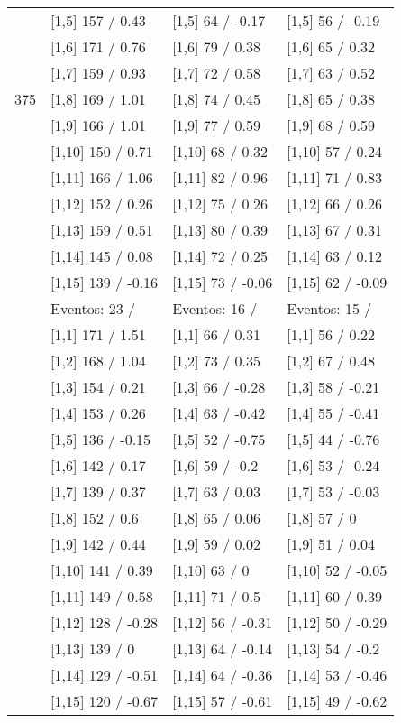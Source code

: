 \begin{table}
\begin{tabular}[t]{llll}
 & {}[1,5] 157  / 0.43 & {}[1,5] 64  / -0.17 & {}[1,5] 56  / -0.19\\
 & {}[1,6] 171  / 0.76 & {}[1,6] 79  / 0.38 & {}[1,6] 65  / 0.32\\
 & {}[1,7] 159  / 0.93 & {}[1,7] 72  / 0.58 & {}[1,7] 63  / 0.52\\
375 & {}[1,8] 169  / 1.01 & {}[1,8] 74  / 0.45 & {}[1,8] 65  / 0.38\\
\addlinespace
 & {}[1,9] 166  / 1.01 & {}[1,9] 77  / 0.59 & {}[1,9] 68  / 0.59\\
 & {}[1,10] 150  / 0.71 & {}[1,10] 68  / 0.32 & {}[1,10] 57  / 0.24\\
 & {}[1,11] 166  / 1.06 & {}[1,11] 82  / 0.96 & {}[1,11] 71  / 0.83\\
 & {}[1,12] 152  / 0.26 & {}[1,12] 75  / 0.26 & {}[1,12] 66  / 0.26\\
 & {}[1,13] 159  / 0.51 & {}[1,13] 80  / 0.39 & {}[1,13] 67  / 0.31\\
\addlinespace
 & {}[1,14] 145  / 0.08 & {}[1,14] 72  / 0.25 & {}[1,14] 63  / 0.12\\
 & {}[1,15] 139  / -0.16 & {}[1,15] 73  / -0.06 & {}[1,15] 62  / -0.09\\
 & Eventos:  23 / & Eventos:  16 / & Eventos:  15 /\\
 & {}[1,1] 171  / 1.51 & {}[1,1] 66  / 0.31 & {}[1,1] 56  / 0.22\\
 & {}[1,2] 168  / 1.04 & {}[1,2] 73  / 0.35 & {}[1,2] 67  / 0.48\\
\addlinespace
 & {}[1,3] 154  / 0.21 & {}[1,3] 66  / -0.28 & {}[1,3] 58  / -0.21\\
 & {}[1,4] 153  / 0.26 & {}[1,4] 63  / -0.42 & {}[1,4] 55  / -0.41\\
 & {}[1,5] 136  / -0.15 & {}[1,5] 52  / -0.75 & {}[1,5] 44  / -0.76\\
 & {}[1,6] 142  / 0.17 & {}[1,6] 59  / -0.2 & {}[1,6] 53  / -0.24\\
 & {}[1,7] 139  / 0.37 & {}[1,7] 63  / 0.03 & {}[1,7] 53  / -0.03\\
\addlinespace
500 & {}[1,8] 152  / 0.6 & {}[1,8] 65  / 0.06 & {}[1,8] 57  / 0\\
 & {}[1,9] 142  / 0.44 & {}[1,9] 59  / 0.02 & {}[1,9] 51  / 0.04\\
 & {}[1,10] 141  / 0.39 & {}[1,10] 63  / 0 & {}[1,10] 52  / -0.05\\
 & {}[1,11] 149  / 0.58 & {}[1,11] 71  / 0.5 & {}[1,11] 60  / 0.39\\
 & {}[1,12] 128  / -0.28 & {}[1,12] 56  / -0.31 & {}[1,12] 50  / -0.29\\
\addlinespace
 & {}[1,13] 139  / 0 & {}[1,13] 64  / -0.14 & {}[1,13] 54  / -0.2\\
 & {}[1,14] 129  / -0.51 & {}[1,14] 64  / -0.36 & {}[1,14] 53  / -0.46\\
 & {}[1,15] 120  / -0.67 & {}[1,15] 57  / -0.61 & {}[1,15] 49  / -0.62\\
\bottomrule
\end{tabular}
\end{table}
